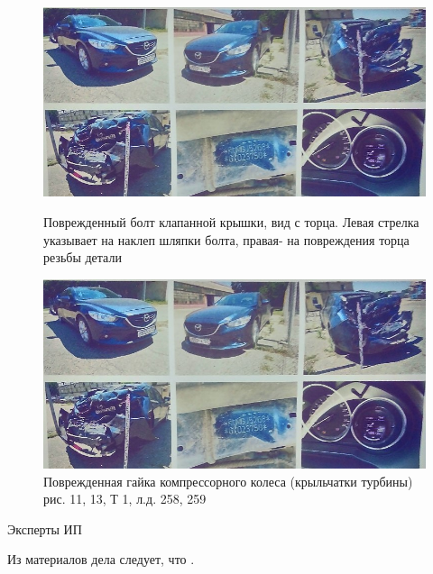 

\begin{figure}[!h]\centering
	\parbox[t]{0.49\textwidth}
	{\centering
		\includegraphics[width=.49\textwidth]{images/b2}
		\caption{\footnotesize {Поврежденный болт клапанной крышки, вид с торца. Левая стрелка указывает на наклеп шляпки болта, правая- на повреждения торца резьбы детали }}
		\label{ris:images/b2}}
	\hfil \hfil
	\parbox[t]{0.49\textwidth}
	{\centering
		\includegraphics[width=.49\textwidth]{images/g1}
		\caption{\footnotesize {Поврежденная гайка  компрессорного колеса (крыльчатки турбины)
				рис. 11, 13, Т 1, л.д. 258, 259}}
		\label{ris:images/g1}}
	
\end{figure}


Эксперты ИП 
%

Из материалов дела следует, что .


